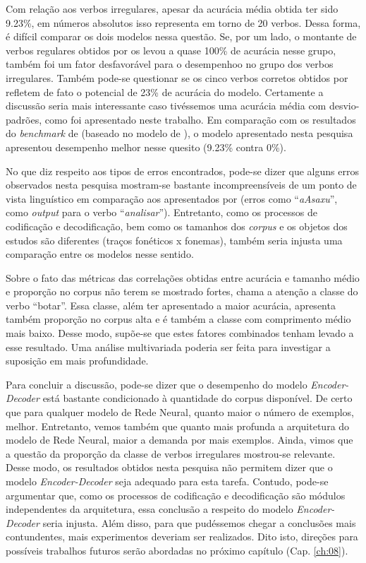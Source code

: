 Com relação aos verbos irregulares, apesar da acurácia média obtida ter sido 9.23\%, em números absolutos isso representa em torno de 20 verbos. Dessa forma, é difícil comparar os dois modelos nessa questão. Se, por um lado, o montante de verbos regulares obtidos por \cite{kirov:2018} os levou a quase 100\% de acurácia nesse grupo, também foi um fator desfavorável para o desempenhoo no grupo dos verbos irregulares. Também pode-se questionar se os cinco verbos corretos obtidos por \cite{kirov:2018} refletem de fato o potencial de 23\% de acurácia do modelo. Certamente a discussão seria mais interessante caso tivéssemos uma acurácia média com desvio-padrões, como foi apresentado neste trabalho. Em comparação com os resultados do \textit{benchmark} de \cite{kirov:2018} (baseado no modelo de \cite{Albright2003RulesVA}), o modelo apresentado nesta pesquisa apresentou desempenho melhor nesse quesito (9.23\% contra 0\%). 

No que diz respeito aos tipos de erros encontrados, pode-se dizer que alguns erros observados nesta pesquisa mostram-se bastante incompreensíveis de um ponto de vista linguístico em comparação aos apresentados por \cite{kirov:2018} (erros como “\textit{aAsaxu}”, como \textit{output} para o verbo “\textit{analisar}”). Entretanto, como os processos de codificação e decodificação, bem como os tamanhos dos \textit{corpus} e os objetos dos estudos são diferentes (traços fonéticos x fonemas), também seria injusta uma comparação entre os modelos nesse sentido.

Sobre o fato das métricas das correlações obtidas entre acurácia e tamanho médio e proporção no corpus não terem se mostrado fortes,
 chama a atenção a classe do verbo “botar”. Essa classe, além ter apresentado a maior acurácia, apresenta também proporção no corpus  alta e é também a classe com comprimento médio mais baixo. Desse modo, supõe-se que estes fatores combinados tenham levado a esse resultado. Uma análise multivariada poderia ser feita para investigar a suposição em mais profundidade.

Para concluir a discussão, pode-se dizer que o desempenho do modelo \textit{Encoder-Decoder} está bastante condicionado à quantidade do corpus disponível. De certo que para qualquer modelo de Rede Neural, quanto maior o número de exemplos, melhor. Entretanto, vemos também que quanto mais profunda a arquitetura do modelo de Rede Neural, maior a demanda por mais exemplos. Ainda, vimos que a questão da proporção da classe de verbos irregulares mostrou-se relevante. Desse modo, os resultados obtidos nesta pesquisa não permitem dizer que o modelo \textit{Encoder-Decoder} seja adequado para esta tarefa. Contudo, pode-se argumentar que, como os processos de codificação e decodificação são módulos independentes da arquitetura, essa conclusão a respeito do modelo \textit{Encoder-Decoder} seria injusta. Além disso, para que pudéssemos chegar a conclusões mais contundentes, mais experimentos deveriam ser realizados. Dito isto, direções para possíveis trabalhos futuros serão abordadas no próximo capítulo (Cap. \ref{ch:08}). 

  